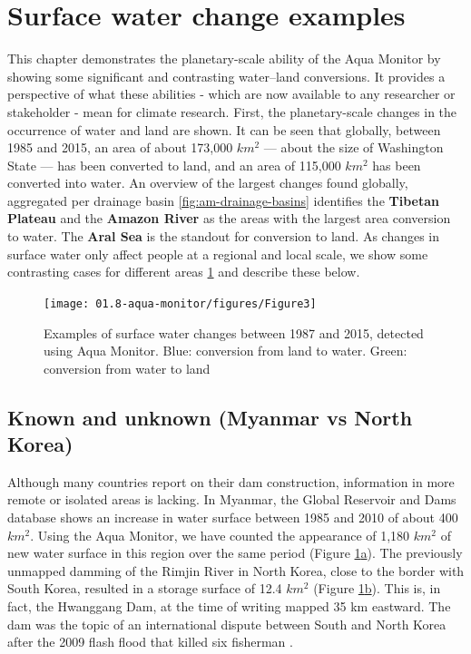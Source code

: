 \section{Surface water change examples}

This chapter demonstrates the planetary-scale ability of the Aqua Monitor by showing some significant and contrasting water–land conversions. It provides a perspective of what these abilities - which are now available to any researcher or stakeholder - mean for climate research. First, the planetary-scale changes in the occurrence of water and land are shown. It can be seen that globally, between 1985 and 2015, an area of about 173,000 $km^2$ — about the size of Washington State — has been converted to land, and an area of 115,000 $km^2$ has been converted into water. An overview of the largest changes found globally, aggregated per drainage basin \ref{fig:am-drainage-basins} identifies the \textbf{Tibetan Plateau} and the \textbf{Amazon River} as the areas with the largest area conversion to water. The \textbf{Aral Sea} is the standout for conversion to land. As changes in surface water only affect people at a regional and local scale, we show some contrasting cases for different areas \ref{fig:am-examples} and describe these below.

\begin{figure}[H]
	\centering
	\texttt{[image: 01.8-aqua-monitor/figures/Figure3]}
	\caption{Examples of surface water changes between 1987 and 2015, detected using Aqua Monitor. Blue: conversion from land to water. Green: conversion from water to land}
	\label{fig:am-examples}
\end{figure}

\subsection{Known and unknown (Myanmar vs North Korea)}
Although many countries report on their dam construction, information in more remote or isolated areas is lacking. In Myanmar, the Global Reservoir and Dams database \citet{Lehner2011} shows an increase in water surface between 1985 and 2010 of about 400 $km^2$. Using the Aqua Monitor, we have counted the appearance of 1,180 $km^2$ of new water surface in this region over the same period (Figure \hyperref[fig:am-examples]{\ref{fig:am-examples}a}). The previously unmapped damming of the Rimjin River in North Korea, close to the border with South Korea, resulted in a storage surface of 12.4 $km^2$ (Figure \hyperref[fig:am-examples]{\ref{fig:am-examples}b}). This is, in fact, the Hwanggang Dam, at the time of writing mapped 35 km eastward. The dam was the topic of an international dispute between South and North Korea after the 2009 flash flood that killed six fisherman \citet{SangHun2009}.

